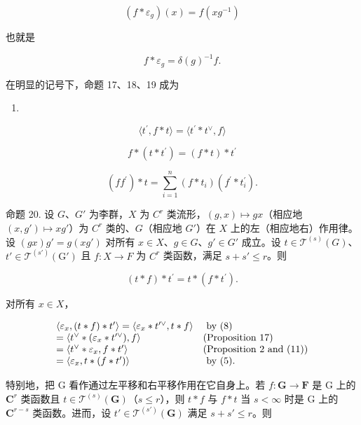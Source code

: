 \[
(f * \varepsilon_ {g}) (x) = f (x g ^ {- 1})\tag{9}
\]

也就是

\[
f * \varepsilon_ {g} = \delta (g) ^ {- 1} f.\tag{10}
\]

在明显的记号下，命题 17、18、19 成为

\begin{enumerate}
\def\labelenumi{(\arabic{enumi})}
\setcounter{enumi}{10}
\tightlist
\item
\end{enumerate}

\[
\langle t ^ {\prime}, f * t \rangle = \langle t ^ {\prime} * t ^ {\vee}, f \rangle\tag{11}
\]

\[
f * (t * t ^ {\prime}) = (f * t) * t ^ {\prime}\tag{12}
\]

\[
(f f ^ {\prime}) * t = \sum_ {i = 1} ^ {n} (f * t _ {i}) (f ^ {\prime} * t _ {i} ^ {\prime}).\tag{13}
\]

命题 20. 设 \(G\)、\(G'\) 为李群，\(X\) 为 \(C^r\) 类流形，\((g, x) \mapsto gx\)（相应地 \((x, g') \mapsto xg'\)）为 \(C^r\) 类的、\(G\)（相应地 \(G'\)）在 \(X\) 上的左（相应地右）作用律。设 \((gx)g' = g(xg')\) 对所有 \(x \in X\)、\(g \in G\)、\(g' \in G'\) 成立。设 \(t \in \mathcal{T}^{(s)}(G)\)、\(t' \in \mathcal{T}^{(s')}(\mathrm{G}')\) 且 \(f: X \to F\) 为 \(C^r\) 类函数，满足 \(s + s' \leqslant r\)。则

\[
(t * f) * t ^ {\prime} = t * (f * t ^ {\prime}).
\]

对所有 \(x \in X\)，

\[
\begin{array}{l l} \langle \varepsilon_ {x}, (t * f) * t ^ {\prime} \rangle = \langle \varepsilon_ {x} * t ^ {\prime \vee}, t * f \rangle & \text { by   (8) } \\ = \langle t ^ {\vee} * (\varepsilon_ {x} * t ^ {\prime \vee}), f \rangle & \text {(Proposition 17)} \\ = \langle t ^ {\vee} * \varepsilon_ {x}, f * t ^ {\prime} \rangle & \text {(Proposition 2 and (11))} \\ = \langle \varepsilon_ {x}, t * (f * t ^ {\prime}) \rangle & \text { by   (5). } \end{array}
\]

特别地，把 G 看作通过左平移和右平移作用在它自身上。若 \(f \colon \mathbf{G} \to \mathbf{F}\) 是 G 上的 \(\mathbf{C}^r\) 类函数且 \(t \in \mathcal{T}^{(s)}(\mathbf{G})\)（\(s \leqslant r\)），则 \(t * f\) 与 \(f * t\) 当 \(s < \infty\) 时是 G 上的 \(\mathbf{C}^{r - s}\) 类函数。进而，设 \(t' \in \mathcal{T}^{(s')}(\mathbf{G})\) 满足 \(s + s' \leqslant r\)。则

